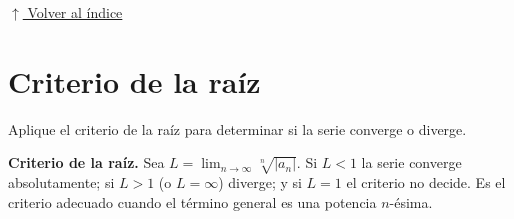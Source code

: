 \documentclass[12pt]{article}
\newcommand{\volverindice}{%
    \vspace{1em}%
    \begin{flushright}%
        \hyperlink{indice}{\small $\uparrow$ Volver al índice}%
    \end{flushright}%
}
\begin{document}
\volverindice
\newpage


\section{Criterio de la raíz}

Aplique el criterio de la raíz para determinar si la serie converge o diverge.

\vspace{0.5em}
\textbf{Criterio de la raíz.} Sea
$\displaystyle L=\lim_{n\to\infty}\sqrt[n]{|a_n|}$. Si $L<1$ la serie converge
absolutamente; si $L>1$ (o $L=\infty$) diverge; y si $L=1$ el criterio no
decide. Es el criterio adecuado cuando el término general es una potencia
$n$-ésima.
\end{document}
